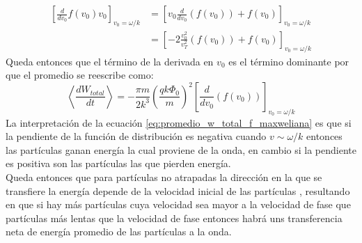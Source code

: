 \begin{align}
\left[\frac{d}{dv_0}f(v_0)v_0\right]_{v_0=\omega /k} &= \left[v_0 \frac{d}{dv_0}(f(v_0))+f(v_0)\right]_{v_0=\omega /k}\\
&=\left[-2 \frac{v_0^2}{v_T^2}(f(v_0))+f(v_0)\right]_{v_0=\omega /k}
\end{align}
Queda entonces que el término de la derivada en $v_0$ es el término dominante por que el promedio se reescribe como:
\begin{equation}
\label{eq:promedio_w_total_f_maxweliana}
\left\langle \frac{dW_{total}}{dt}\right\rangle=-\frac{\pi m}{2k^3}\left(\frac{qk\Phi_0}{m}\right)^2\left[\frac{d}{dv_0}(f(v_0))\right]_{v_0=\omega /k}
\end{equation}
La interpretación de la ecuación \ref{eq:promedio_w_total_f_maxweliana} es que si la pendiente de la función de distribución es negativa cuando $v\sim \omega /k$ entonces las partículas ganan energía la cual proviene de la onda, en cambio si la pendiente es positiva son las partículas las que pierden energía.\\
Queda entonces que para partículas no atrapadas la dirección en la que se transfiere la energía depende de la velocidad inicial de las partículas , resultando en que si hay más partículas cuya velocidad sea mayor a la velocidad de fase que partículas más lentas que la velocidad de fase entonces habrá uns transferencia neta de energía promedio de las partículas a la onda.
